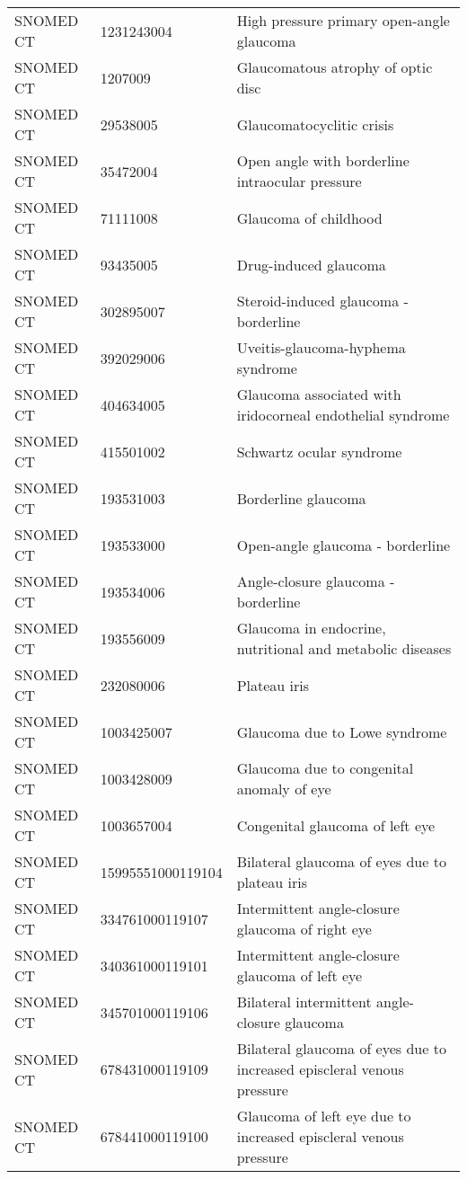 \begin{longtable}{p{}p{}p{}}
  SNOMED CT & 1231243004 & High pressure primary open-angle glaucoma \\ 
  SNOMED CT & 1207009 & Glaucomatous atrophy of optic disc \\ 
  SNOMED CT & 29538005 & Glaucomatocyclitic crisis \\ 
  SNOMED CT & 35472004 & Open angle with borderline intraocular pressure \\ 
  SNOMED CT & 71111008 & Glaucoma of childhood \\ 
  SNOMED CT & 93435005 & Drug-induced glaucoma \\ 
  SNOMED CT & 302895007 & Steroid-induced glaucoma - borderline \\ 
  SNOMED CT & 392029006 & Uveitis-glaucoma-hyphema syndrome \\ 
  SNOMED CT & 404634005 & Glaucoma associated with iridocorneal endothelial syndrome \\ 
  SNOMED CT & 415501002 & Schwartz ocular syndrome \\ 
  SNOMED CT & 193531003 & Borderline glaucoma \\ 
  SNOMED CT & 193533000 & Open-angle glaucoma - borderline \\ 
  SNOMED CT & 193534006 & Angle-closure glaucoma - borderline \\ 
  SNOMED CT & 193556009 & Glaucoma in endocrine, nutritional and metabolic diseases \\ 
  SNOMED CT & 232080006 & Plateau iris \\ 
  SNOMED CT & 1003425007 & Glaucoma due to Lowe syndrome \\ 
  SNOMED CT & 1003428009 & Glaucoma due to congenital anomaly of eye \\ 
  SNOMED CT & 1003657004 & Congenital glaucoma of left eye \\ 
  SNOMED CT & 15995551000119104 & Bilateral glaucoma of eyes due to plateau iris \\ 
  SNOMED CT & 334761000119107 & Intermittent angle-closure glaucoma of right eye \\ 
  SNOMED CT & 340361000119101 & Intermittent angle-closure glaucoma of left eye \\ 
  SNOMED CT & 345701000119106 & Bilateral intermittent angle-closure glaucoma \\ 
  SNOMED CT & 678431000119109 & Bilateral glaucoma of eyes due to increased episcleral venous pressure \\ 
  SNOMED CT & 678441000119100 & Glaucoma of left eye due to increased episcleral venous pressure \\ 

\end{longtable}
